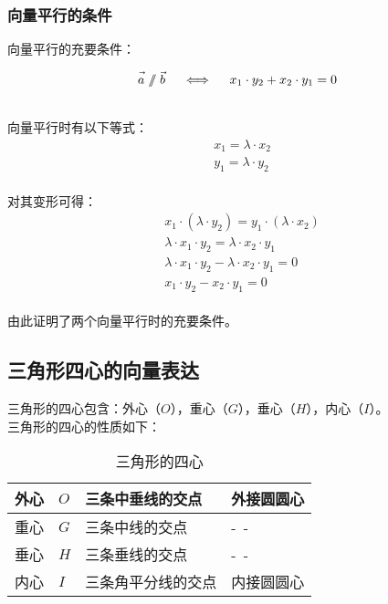 \documentclass[UTF8]{ctexart}
\let\nvec\vec
\def\vec#1{\nvec{\vphantom b\smash{#1}}}
\renewcommand\parallel{{\hspace{3.0pt}\mathrel{/\mskip-6.5mu/}\hspace{2.6pt}}}
\begin{document}
\subsubsection{向量平行的条件}
    \setcounter{equation}{0}
    向量平行的充要条件：
    \begin{large}
        \begin{equation*}
            \vec{a}\parallel\vec{b}~~~~\Longleftrightarrow~~~~x_1\cdot y_2+x_2\cdot y_1=0
        \end{equation*}
    \end{large}\\
    向量平行时有以下等式：
    \begin{align}
        &x_1=\lambda\cdot x_2\\[3mm]
        &y_1=\lambda\cdot y_2
    \end{align}\\
    对其变形可得：
    \begin{align}
        &x_1\cdot(\lambda\cdot y_2)=y_1\cdot(\lambda\cdot x_2)\\[3mm]
        &\lambda\cdot x_1\cdot y_2=\lambda\cdot x_2\cdot y_1\\[3mm]
        &\lambda\cdot x_1\cdot y_2-\lambda\cdot x_2\cdot y_1=0\\[3mm]
        &x_1\cdot y_2-x_2\cdot y_1=0
    \end{align}\\
    由此证明了两个向量平行时的充要条件。
    
\newpage

\subsection{三角形四心的向量表达}
    三角形的四心包含：外心（$O$），重心（$G$），垂心（$H$），内心（$I$）。\\[3mm]
    三角形的四心的性质如下：
    \begin{table}[h]
        \begin{center}
            \begin{tabular}{p{40pt}|p{40pt}|p{100pt}|p{80pt}}
                \hline
                外心&$O$&三条中垂线的交点&外接圆圆心\\ \hline
                重心&$G$&三条中线的交点&-~-\\ \hline
                垂心&$H$&三条垂线的交点&-~-\\ \hline
                内心&$I$&三条角平分线的交点&内接圆圆心\\ \hline
            \end{tabular}
            \caption{三角形的四心}
        \end{center}
    \end{table}\vspace{-20pt}
\end{document}
